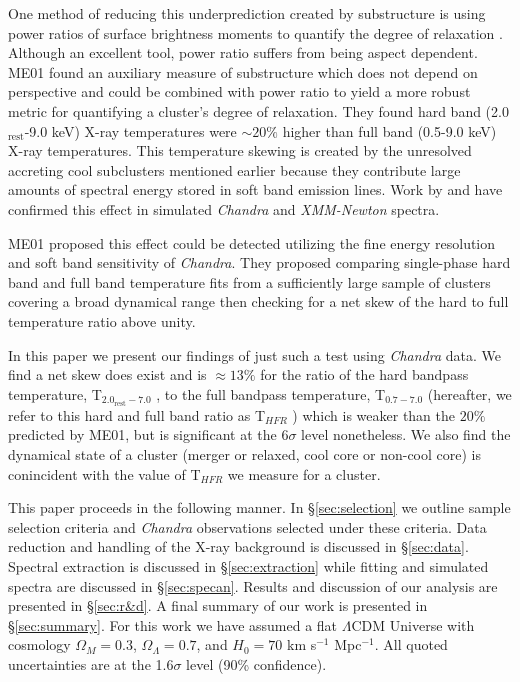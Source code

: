 \documentclass{emulateapj}
\newcommand{\tf}{T$_{HFR}$ }
\newcommand{\hard}{T$_{2.0_{\text{rest}}-7.0}$ }
\newcommand{\full}{T$_{0.7-7.0}$ }
\begin{document}
One method of reducing this underprediction created by substructure is
using power ratios of surface brightness moments to quantify the degree of
relaxation \citep{1995ApJ...452..522B, 1996ApJ...458...27B,
2005ApJ...624..606J}. Although an excellent tool, power ratio
suffers from being aspect dependent. ME01 found an auxiliary measure
of substructure which does not depend on perspective and could be
combined with power ratio to yield a more robust metric for
quantifying a cluster's degree of relaxation. They found hard band 
(2.0$_{\text{rest}}$-9.0 keV) X-ray temperatures were $\sim 20\%$ higher than full band
(0.5-9.0 keV) X-ray temperatures. This temperature skewing is created by the
unresolved accreting cool subclusters mentioned earlier because they
contribute large amounts of spectral energy stored in soft
band emission lines. Work by \cite{2004MNRAS.354...10M} and
\cite{2006ApJ...640..710V} have confirmed this effect in simulated
{\textit{Chandra}} and {\textit{XMM-Newton}} spectra.

ME01 proposed this effect could be detected utilizing the fine energy resolution and
soft band sensitivity of {\textit{Chandra}}. They proposed comparing
single-phase hard band and full band temperature fits from a
sufficiently large sample of clusters covering a broad dynamical range
then checking for a net skew of the hard to full temperature ratio above unity.

In this paper we present our findings of just such a test using
{\textit{Chandra}} data. We find a net skew does exist and is 
$\approx 13\%$ for the ratio of the hard bandpass temperature,
\hard, to the full bandpass temperature, \full
(hereafter, we refer to this hard and full band ratio as \tf) which is
weaker than the $20\%$ predicted by ME01, but is significant at the
$6\sigma$ level nonetheless. We also find the dynamical state of a
cluster (merger or relaxed, cool core or non-cool core) is conincident
with the value of \tf we measure for a cluster.

This paper proceeds in the following manner. In \S\ref{sec:selection}
we outline sample selection criteria and {\textit{Chandra}}
observations selected under these criteria. Data reduction and handling of the
X-ray background is discussed in \S\ref{sec:data}. Spectral
extraction is discussed in \S\ref{sec:extraction} while fitting and
simulated spectra are discussed in \S\ref{sec:specan}. Results and
discussion of our analysis are presented in \S\ref{sec:r&d}. A final
summary of our work is presented in \S\ref{sec:summary}. For this work
we have assumed a flat $\Lambda$CDM Universe with cosmology $\Omega_{M} = 0.3$,
$\Omega_{\Lambda} = 0.7$, and $H_{0} = 70$ km s$^{-1}$ Mpc$^{-1}$. All
quoted uncertainties are at the 1.6$\sigma$ level (90\%
confidence). 
\end{document}
